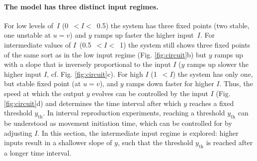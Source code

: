 \documentclass[10pt]{article}
\begin{document}
\paragraph{The model has three distinct input regimes.}
For low levels of~$I$ (0~$<I<$~0.5) the system has three fixed points (two stable, one unstable at $u=v$) and $y$ ramps up faster the higher input~$I$. 
For intermediate values of $I$~(0.5~$<I<$~1) the system still shows three fixed points of the same sort as in the low input regime (Fig. \ref{fig:circuit}b) but $y$ ramps up with a slope that is inversely proportional to the input $I$ ($y$ ramps up slower the higher input $I$, cf. Fig. \ref{fig:circuit}c). 
For high $I$ (1~$<I$) the system has only one, but stable fixed point (at $u=v$), and $y$ ramps down faster for higher $I$.
Thus, the speed at which the output $y$ evolves can be controlled by the input $I$ (Fig. \ref{fig:circuit}d) and determines the time interval after which $y$ reaches a fixed threshold $y_{\text{th}}$. 
In interval reproduction experiments, reaching a threshold $y_{\text{th}}$ can be understood as movement initiation time, which can be controlled for by adjusting $I$.
In this section, the intermediate input regime is explored: higher inputs result in a shallower slope of $y$, such that the threshold $y_{\text{th}}$ is reached after a longer time interval.
\end{document}
